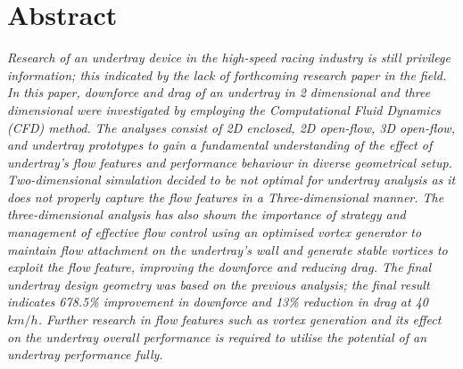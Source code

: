 \newpage
\thispagestyle{empty}
\section*{Abstract} 
\justifying

\textit{Research of an undertray device in the high-speed racing industry is still privilege information; this indicated by the lack of forthcoming research paper in the field. In this paper, downforce and drag of an undertray in 2 dimensional and three dimensional were investigated by employing the Computational Fluid Dynamics (CFD) method. The analyses consist of 2D enclosed, 2D open-flow, 3D open-flow, and undertray prototypes to gain a fundamental understanding of the effect of undertray's flow features and performance behaviour in diverse geometrical setup. Two-dimensional simulation decided to be not optimal for undertray analysis as it does not properly capture the flow features in a Three-dimensional manner. The three-dimensional analysis has also shown the importance of strategy and management of effective flow control using an optimised vortex generator to maintain flow attachment on the undertray's wall and generate stable vortices to exploit the flow feature, improving the downforce and reducing drag. The final undertray design geometry was based on the previous analysis; the final result indicates 678.5\% improvement in downforce and 13\% reduction in drag at 40 $km/h$. Further research in flow features such as vortex generation and its effect on the undertray overall performance is required to utilise the potential of an undertray performance fully.}

